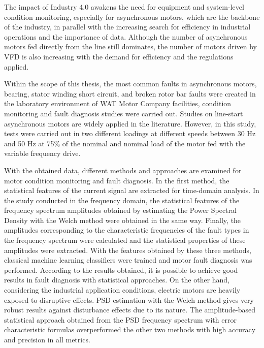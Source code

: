 The impact of Industry 4.0 awakens the need for equipment and system-level condition monitoring, especially for asynchronous motors, which are the backbone of the industry, in parallel with the increasing search for efficiency in industrial operations and the importance of data. Although the number of asynchronous motors fed directly from the line still dominates, the number of motors driven by VFD is also increasing with the demand for efficiency and the regulations applied.

Within the scope of this thesis, the most common faults in asynchronous motors, bearing, stator winding short circuit, and broken rotor bar faults were created in the laboratory environment of WAT Motor Company facilities, condition monitoring and fault diagnosis studies were carried out. Studies on line-start asynchronous motors are widely applied in the literature. However, in this study, tests were carried out in two different loadings at different speeds between 30 Hz and 50 Hz at 75\% of the nominal and nominal load of the motor fed with the variable frequency drive.

With the obtained data, different methods and approaches are examined for motor condition monitoring and fault diagnosis. In the first method, the statistical features of the current signal are extracted for time-domain analysis. In the study conducted in the frequency domain, the statistical features of the frequency spectrum amplitudes obtained by estimating the Power Spectral Density with the Welch method were obtained in the same way. Finally, the amplitudes corresponding to the characteristic frequencies of the fault types in the frequency spectrum were calculated and the statistical properties of these amplitudes were extracted. With the features obtained by these three methods, classical machine learning classifiers were trained and motor fault diagnosis was performed. According to the results obtained, it is possible to achieve good results in fault diagnosis with statistical approaches. On the other hand, considering the industrial application conditions, electric motors are heavily exposed to disruptive effects. PSD estimation with the Welch method gives very robust results against disturbance effects due to its nature. The amplitude-based statistical approach obtained from the PSD frequency spectrum with error characteristic formulas overperformed the other two methods with high accuracy and precision in all metrics.

